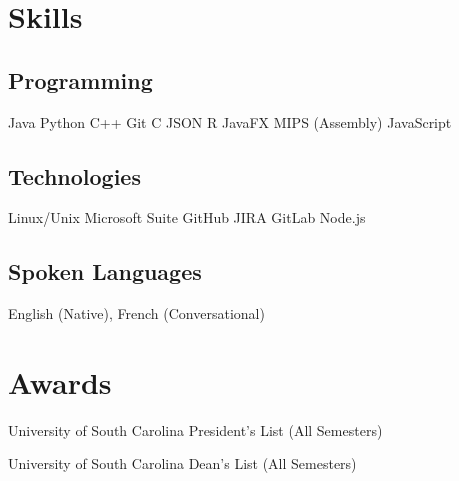 \documentclass[letterpaper]{deedy-resume}
\begin{document}
\begin{minipage}[t]{0.29\textwidth}
\sectionspace

\section{Skills}

\subsection{Programming}
Java \textbullet{} Python \textbullet{} C++ \textbullet{} Git \textbullet{} C \textbullet{} JSON  R \textbullet{} JavaFX \textbullet{} MIPS (Assembly) \textbullet{} JavaScript
\sectionspace

\subsection{Technologies}
Linux/Unix \textbullet{} Microsoft Suite \textbullet{} GitHub JIRA \textbullet{} GitLab \textbullet{}Node.js 
\sectionspace 

\subsection{Spoken Languages}
English (Native), French (Conversational)


\sectionspace

\section{Awards}
\vspace{0.2cm}
\setlength{\leftmargini}{1em}
\begin{tightitemize}
\item University of South Carolina President's List (All Semesters)
\item University of South Carolina Dean's List (All Semesters)
\end{tightitemize}


\sectionspace


\sectionspace 

\end{minipage} 
\hfill
%
%
\end{document}
